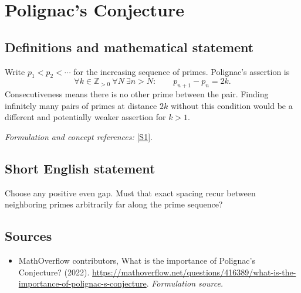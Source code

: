 \documentclass[11pt]{article}
\begin{document}
\section*{\texorpdfstring{Polignac's Conjecture}{Polignac's Conjecture}}\label{statement}
\subsection{Definitions and mathematical statement}
Write $p_1<p_2<\cdots$ for the increasing sequence of primes. Polignac's assertion is
\[
 \forall k\in{\mathbb{Z}}_{>0}\ \forall N\ \exists n>N:\qquad p_{n+1}-p_n=2k.
\]
Consecutiveness means there is no other prime between the pair. Finding infinitely many pairs of primes at distance $2k$ without this condition would be a different and potentially weaker assertion for $k>1$.
\par\smallskip\textit{Formulation and concept references:} \href{https://mathoverflow.net/questions/416389/what-is-the-importance-of-polignac-s-conjecture}{[S1]}.

\subsection{Short English statement}
Choose any positive even gap. Must that exact spacing recur between neighboring primes arbitrarily far along the prime sequence?
\subsection{Sources}
\begin{itemize}
\item[S1]MathOverflow contributors, What is the importance of Polignac's Conjecture? (2022).
\url{https://mathoverflow.net/questions/416389/what-is-the-importance-of-polignac-s-conjecture}.
\textit{Formulation source.}
\end{itemize}
\end{document}
